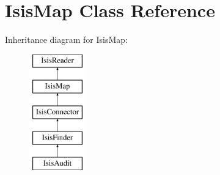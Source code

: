 \hypertarget{classIsisMap}{
\section{IsisMap Class Reference}
\label{classIsisMap}
}
Inheritance diagram for IsisMap:\begin{figure}[H]
\begin{center}
\leavevmode
\includegraphics[height=5cm]{classIsisMap}
\end{center}
\end{figure}
